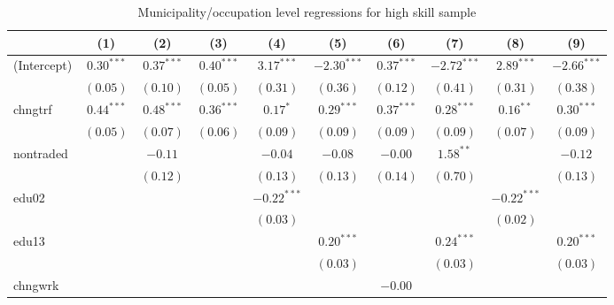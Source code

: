 
\begin{table}
\caption{Municipality/occupation level regressions for high skill sample}
\begin{center}
\begin{tabular}{l c c c c c c c c c }
\hline
 & (1) & (2) & (3) & (4) & (5) & (6) & (7) & (8) & (9) \\
\hline
(Intercept)          & $0.30^{***}$ & $0.37^{***}$ & $0.40^{***}$ & $3.17^{***}$  & $-2.30^{***}$ & $0.37^{***}$ & $-2.72^{***}$ & $2.89^{***}$  & $-2.66^{***}$ \\
                     & $(0.05)$     & $(0.10)$     & $(0.05)$     & $(0.31)$      & $(0.36)$      & $(0.12)$     & $(0.41)$      & $(0.31)$      & $(0.38)$      \\
chngtrf              & $0.44^{***}$ & $0.48^{***}$ & $0.36^{***}$ & $0.17^{*}$    & $0.29^{***}$  & $0.37^{***}$ & $0.28^{***}$  & $0.16^{**}$   & $0.30^{***}$  \\
                     & $(0.05)$     & $(0.07)$     & $(0.06)$     & $(0.09)$      & $(0.09)$      & $(0.09)$     & $(0.09)$      & $(0.07)$      & $(0.09)$      \\
nontraded            &              & $-0.11$      &              & $-0.04$       & $-0.08$       & $-0.00$      & $1.58^{**}$   &               & $-0.12$       \\
                     &              & $(0.12)$     &              & $(0.13)$      & $(0.13)$      & $(0.14)$     & $(0.70)$      &               & $(0.13)$      \\
edu02                &              &              &              & $-0.22^{***}$ &               &              &               & $-0.22^{***}$ &               \\
                     &              &              &              & $(0.03)$      &               &              &               & $(0.02)$      &               \\
edu13                &              &              &              &               & $0.20^{***}$  &              & $0.24^{***}$  &               & $0.20^{***}$  \\
                     &              &              &              &               & $(0.03)$      &              & $(0.03)$      &               & $(0.03)$      \\
chngwrk              &              &              &              &               &               & $-0.00$      &               &               &               \\

\end{tabular}
\end{center}
\end{table}
